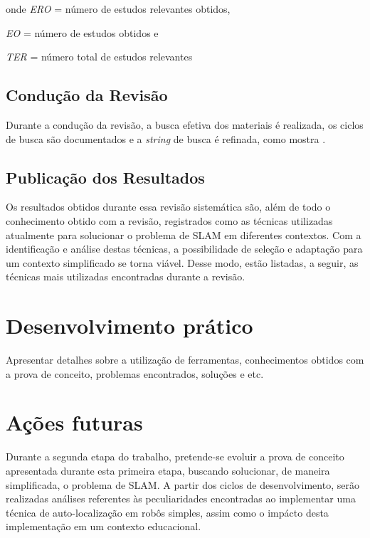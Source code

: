 			onde \textit{ERO} = número de estudos relevantes obtidos,
			
			\textit{EO} = número de estudos obtidos e

			\textit{TER} = número total de estudos relevantes

		

	\subsection{Condução da Revisão} %
	\label{sub:conducaoRevisao}
		
		Durante a condução da revisão, a busca efetiva dos materiais é realizada, os ciclos de busca são documentados e a \textit{string} de busca é refinada, como mostra \cite{estudoPrimarioSecundario}.

	\subsection{Publicação dos Resultados} %
	\label{sub:publicacaoRevisao}
		
		Os resultados obtidos durante essa revisão sistemática são, além de todo o conhecimento obtido com a revisão, registrados como as técnicas utilizadas atualmente para solucionar o problema de SLAM em diferentes contextos. Com a identificação e análise destas técnicas, a possibilidade de seleção e adaptação para um contexto simplificado se torna viável. Desse modo, estão listadas, a seguir, as técnicas mais utilizadas encontradas durante a revisão.




\section{Desenvolvimento prático} %
\label{sec:desenvolvimento_prático}

	Apresentar detalhes sobre a utilização de ferramentas, conhecimentos obtidos com a prova de conceito, problemas encontrados, soluções e etc.

\section{Ações futuras} %
\label{sec:acoes_futuras}

	Durante a segunda etapa do trabalho, pretende-se evoluir a prova de conceito apresentada durante esta primeira etapa, buscando solucionar, de maneira simplificada, o problema de SLAM. A partir dos ciclos de desenvolvimento, serão realizadas análises referentes às peculiaridades encontradas ao implementar uma técnica de auto-localização em robôs simples, assim como o impácto desta implementação em um contexto educacional.

